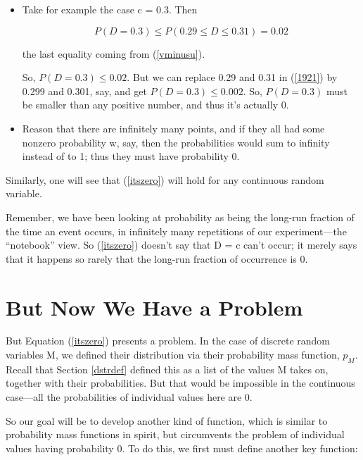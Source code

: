 \begin{itemize}

\item Take for example the case c = 0.3.  Then

\begin{equation}
\label{1921}
P(D = 0.3) \leq P( 0.29 \leq D \leq 0.31) = 0.02
\end{equation}

the last equality coming from (\ref{vminusu}).  

So, $P(D = 0.3) \leq 0.02$.  But we can replace 0.29 and 0.31 in
(\ref{1921}) by 0.299 and 0.301, say, and get $P(D = 0.3) \leq 0.002$.  
So, $P(D = 0.3)$ must be smaller than any positive number, and thus it's
actually 0.

\item Reason that there are infinitely many points, and if they all had
some nonzero probability w, say, then the probabilities would sum to
infinity instead of to 1; thus they must have probability 0.

\end{itemize}

Similarly, one will see that (\ref{itszero}) will hold for any
continuous random variable.

Remember, we have been looking at probability as being the long-run
fraction of the time an event occurs, in infinitely many repetitions of
our experiment---the ``notebook'' view.  So (\ref{itszero}) doesn't say
that D = c can't occur; it merely says that it happens so rarely that
the long-run fraction of occurrence is 0. 

\section{But Now We Have a Problem}
\label{presentsaproblem}

But Equation (\ref{itszero}) presents a problem.  In the case of
discrete random variables M, we defined their distribution via their
probability mass function, $p_M$.  Recall that Section \ref{dstrdef}
defined this as a list of the values M takes on, together with their
probabilities.  But that would be impossible in the continuous
case---all the probabilities of individual values here are 0.

So our goal will be to develop another kind of function, which is
similar to probability mass functions in spirit, but circumvents the
problem of individual values having probability 0.  To do this, 
we first must define another key function:

